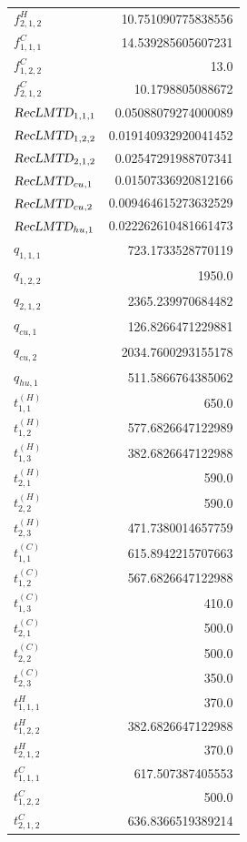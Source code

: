\documentclass{article}%
\begin{document}
\begin{multicols*}{3}
\begin{supertabular}{lr}
	$f_{2,1,2}^{H}$ & 10.751090775838556 \\%
	$f_{1,1,1}^{C}$ & 14.539285605607231 \\%
	$f_{1,2,2}^{C}$ & 13.0 \\%
	$f_{2,1,2}^{C}$ & 10.1798805088672 \\%
	$\textsl{RecLMTD}_{1,1,1}$ & 0.05088079274000089 \\%
	$\textsl{RecLMTD}_{1,2,2}$ & 0.019140932920041452 \\%
	$\textsl{RecLMTD}_{2,1,2}$ & 0.02547291988707341 \\%
	$\textsl{RecLMTD}_{cu,1}$ & 0.01507336920812166 \\%
	$\textsl{RecLMTD}_{cu,2}$ & 0.009464615273632529 \\%
	$\textsl{RecLMTD}_{hu,1}$ & 0.022262610481661473 \\%
	$q_{1,1,1}$ & 723.1733528770119 \\%
	$q_{1,2,2}$ & 1950.0 \\%
	$q_{2,1,2}$ & 2365.239970684482 \\%
	$q_{cu,1}$ & 126.8266471229881 \\%
	$q_{cu,2}$ & 2034.7600293155178 \\%
	$q_{hu,1}$ & 511.5866764385062 \\%
	$t_{1,1}^{(H)}$ & 650.0 \\%
	$t_{1,2}^{(H)}$ & 577.6826647122989 \\%
	$t_{1,3}^{(H)}$ & 382.6826647122988 \\%
	$t_{2,1}^{(H)}$ & 590.0 \\%
	$t_{2,2}^{(H)}$ & 590.0 \\%
	$t_{2,3}^{(H)}$ & 471.7380014657759 \\%
	$t_{1,1}^{(C)}$ & 615.8942215707663 \\%
	$t_{1,2}^{(C)}$ & 567.6826647122988 \\%
	$t_{1,3}^{(C)}$ & 410.0 \\%
	$t_{2,1}^{(C)}$ & 500.0 \\%
	$t_{2,2}^{(C)}$ & 500.0 \\%
	$t_{2,3}^{(C)}$ & 350.0 \\%
	$t_{1,1,1}^{H}$ & 370.0 \\%
	$t_{1,2,2}^{H}$ & 382.6826647122988 \\%
	$t_{2,1,2}^{H}$ & 370.0 \\%
	$t_{1,1,1}^{C}$ & 617.507387405553 \\%
	$t_{1,2,2}^{C}$ & 500.0 \\%
	$t_{2,1,2}^{C}$ & 636.8366519389214 \\%

\end{supertabular}
\end{multicols*}
\end{document}
